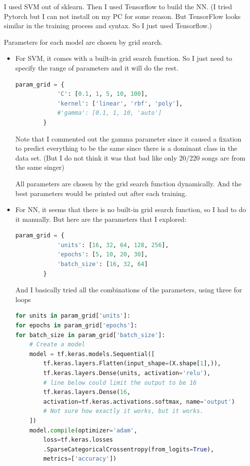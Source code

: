 \documentclass[letterpaper,12pt]{article}
\begin{document}
I used SVM out of sklearn. Then I used Tensorflow to build the NN. (I tried Pytorch but I can not install on my PC for some reason. But TensorFlow looks similar in the training process and syntax. So I just used Tensorflow.)

Parameters for each model are chosen by grid search.\begin{itemize}
    \item For SVM, it comes with a built-in grid search function. So I just need to specify the range of parameters and it will do the rest.\begin{lstlisting}[language=Python]
        param_grid = {
            'C': [0.1, 1, 5, 10, 100],
            'kernel': ['linear', 'rbf', 'poly'],
            #'gamma': [0.1, 1, 10, 'auto']
        }
    \end{lstlisting}
          Note that I commented out the gamma parameter since it caused a fixation to predict everything to be the same since there is a dominant class in the data set. (But I do not think it was that bad like only 20/220 songs are from the same singer)

          All parameters are chosen by the grid search function dynamically. And the best parameters would be printed out after each training.

    \item For NN, it seems that there is no built-in grid search function, so I had to do it manually. But here are the parameters that I explored: \begin{lstlisting}[language=Python]
        param_grid = {
            'units': [16, 32, 64, 128, 256],
            'epochs': [5, 10, 20, 30],
            'batch_size': [16, 32, 64]
        }
    \end{lstlisting}
          And I basically tried all the combinations of the parameters, using three for loops\begin{lstlisting}[language=Python]
for units in param_grid['units']:
for epochs in param_grid['epochs']:
for batch_size in param_grid['batch_size']:
    # Create a model
    model = tf.keras.models.Sequential([
        tf.keras.layers.Flatten(input_shape=(X.shape[1],)),
        tf.keras.layers.Dense(units, activation='relu'),
        # line below could limit the output to be 16
        tf.keras.layers.Dense(16, 
        activation=tf.keras.activations.softmax, name='output')
        # Not sure how exactly it works, but it works.
    ])
    model.compile(optimizer='adam',
        loss=tf.keras.losses
        .SparseCategoricalCrossentropy(from_logits=True),
        metrics=['accuracy'])
    

\end{lstlisting}
\end{itemize}
\end{document}
